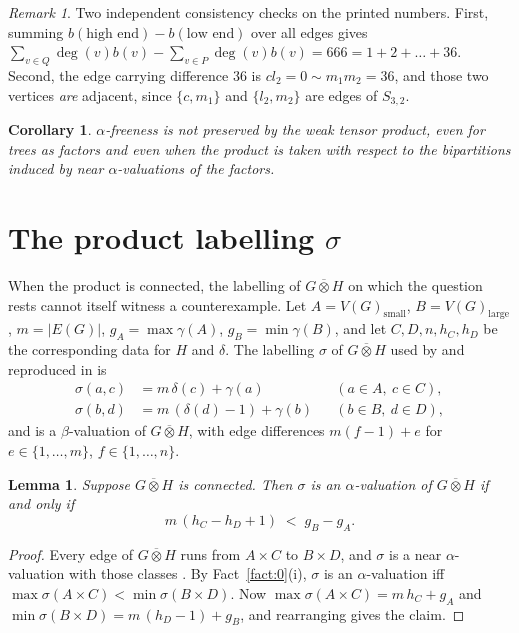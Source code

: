 \documentclass[11pt]{amsart}
\newtheorem{lemma}[theorem]{Lemma}
\newtheorem{corollary}[theorem]{Corollary}
\theoremstyle{definition}
\theoremstyle{remark}
\newtheorem*{remark}{Remark}
\newcommand{\wtp}{\mathbin{\overline{\otimes}}}
\begin{document}
\begin{remark}
Two independent consistency checks on the printed numbers. First, summing
$b(\text{high end})-b(\text{low end})$ over all edges gives
$\sum_{v\in Q}\deg(v)b(v)-\sum_{v\in P}\deg(v)b(v)=666=1+2+\dots+36$. Second,
the edge carrying difference $36$ is $cl_2=0\sim m_1m_2=36$, and those two
vertices \emph{are} adjacent, since $\{c,m_1\}$ and $\{l_2,m_2\}$ are edges of
$S_{3,2}$.
\end{remark}

\begin{corollary}
$\alpha$-freeness is not preserved by the weak tensor product, even for trees
as factors and even when the product is taken with respect to the bipartitions
induced by near $\alpha$-valuations of the factors.
\end{corollary}

\section{The product labelling $\sigma$}\label{sec:why}

When the product is connected, the labelling of $G\wtp H$ on which the question
rests cannot itself witness a counterexample. Let
$A=V(G)_{\mathrm{small}}$, $B=V(G)_{\mathrm{large}}$, $m=|E(G)|$,
$g_A=\max\gamma(A)$, $g_B=\min\gamma(B)$, and let $C,D,n,h_C,h_D$ be the
corresponding data for $H$ and $\delta$. The labelling $\sigma$ of $G\wtp H$
used by \cite{EKV} and reproduced in \cite{AHM} is
\begin{align*}
 \sigma(a,c)&=m\,\delta(c)+\gamma(a) & &(a\in A,\ c\in C),\\
 \sigma(b,d)&=m\,(\delta(d)-1)+\gamma(b) & &(b\in B,\ d\in D),
\end{align*}
and is a $\beta$-valuation of $G\wtp H$, with edge differences $m(f-1)+e$ for
$e\in\{1,\dots,m\}$, $f\in\{1,\dots,n\}$.

\begin{lemma}\label{lem:sigma}
Suppose $G\wtp H$ is connected. Then $\sigma$ is an $\alpha$-valuation of
$G\wtp H$ if and only if
\[
 m\,(h_C-h_D+1)\;<\;g_B-g_A .
\]
\end{lemma}

\begin{proof}
Every edge of $G\wtp H$ runs from $A\times C$ to $B\times D$, and $\sigma$ is
a near $\alpha$-valuation with those classes \cite[Thm.~7]{EKV}. By
Fact~\ref{fact:0}(i), $\sigma$ is an $\alpha$-valuation
iff $\max\sigma(A\times C)<\min\sigma(B\times D)$. Now
$\max\sigma(A\times C)=m\,h_C+g_A$ and
$\min\sigma(B\times D)=m\,(h_D-1)+g_B$, and rearranging gives the claim.
\end{proof}
\end{document}
